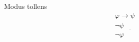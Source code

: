 \begin{ruleinf} \label{relinf_modustollens} Modus tollens
	\begin{equation}
	\begin{gathered}
	    \varphi \to \psi \\
		\underline {\lnot \psi \quad \quad \quad } \\
		\lnot \varphi \quad \quad
	\end{gathered}
	\end{equation}
\end{ruleinf}
